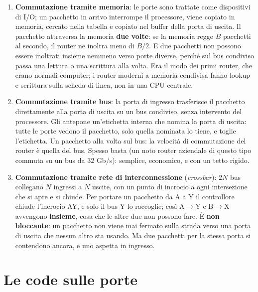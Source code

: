 \begin{enumerate}
    \item \textbf{Commutazione tramite memoria}: le porte sono trattate come dispositivi di I/O; un pacchetto in arrivo
          interrompe il processore, viene copiato in memoria, cercato nella tabella e copiato nel buffer della porta di
          uscita. Il pacchetto attraversa la memoria \textbf{due volte}: se la memoria regge $B$ pacchetti al secondo, il
          router ne inoltra meno di $B/2$. E due pacchetti non possono essere inoltrati insieme nemmeno verso porte diverse,
          perché sul bus condiviso passa una lettura o una scrittura alla volta. Era il modo dei primi router, che erano
          normali computer; i router moderni a memoria condivisa fanno lookup e scrittura sulla scheda di linea, non in una
          CPU centrale.
    \item \textbf{Commutazione tramite bus}: la porta di ingresso trasferisce il pacchetto direttamente alla porta di uscita
          su un bus condiviso, senza intervento del processore. Gli antepone un'etichetta interna che nomina la porta di
          uscita: tutte le porte vedono il pacchetto, solo quella nominata lo tiene, e toglie l'etichetta. Un pacchetto alla
          volta sul bus: la velocità di commutazione del router è quella del bus. Spesso basta (un noto router aziendale di
          questo tipo commuta su un bus da 32 Gb/s): semplice, economico, e con un tetto rigido.
    \item \textbf{Commutazione tramite rete di interconnessione} (\emph{crossbar}): $2N$ bus collegano $N$ ingressi a $N$
          uscite, con un punto di incrocio a ogni intersezione che si apre e si chiude. Per portare un pacchetto da A a Y il
          controllore chiude l'incrocio AY, e solo il bus Y lo raccoglie; così A$\to$Y e B$\to$X avvengono
          \textbf{insieme}, cosa che le altre due non possono fare. È \textbf{non bloccante}: un pacchetto non viene mai
          fermato sulla strada verso una porta di uscita che nessun altro sta usando. Ma due pacchetti per la stessa porta
          si contendono ancora, e uno aspetta in ingresso.
\end{enumerate}

\section{Le code sulle porte}

